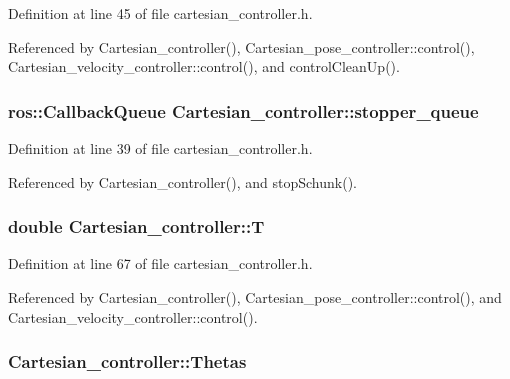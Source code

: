 Definition at line 45 of file cartesian\-\_\-controller.\-h.



Referenced by Cartesian\-\_\-controller(), Cartesian\-\_\-pose\-\_\-controller\-::control(), Cartesian\-\_\-velocity\-\_\-controller\-::control(), and control\-Clean\-Up().

\hypertarget{classCartesian__controller_a52eb090400d8dafaa22aecb037788a66}{
\subsubsection[{stopper\-\_\-queue}]{\setlength{\rightskip}{0pt plus 5cm}ros\-::\-Callback\-Queue Cartesian\-\_\-controller\-::stopper\-\_\-queue\hspace{0.3cm}{\ttfamily [protected]}}}\label{classCartesian__controller_a52eb090400d8dafaa22aecb037788a66}


Definition at line 39 of file cartesian\-\_\-controller.\-h.



Referenced by Cartesian\-\_\-controller(), and stop\-Schunk().

\hypertarget{classCartesian__controller_a35c6ddbb9624878f2807ff644a33e832}{
\subsubsection[{T}]{\setlength{\rightskip}{0pt plus 5cm}double Cartesian\-\_\-controller\-::\-T\hspace{0.3cm}{\ttfamily [protected]}}}\label{classCartesian__controller_a35c6ddbb9624878f2807ff644a33e832}


Definition at line 67 of file cartesian\-\_\-controller.\-h.



Referenced by Cartesian\-\_\-controller(), Cartesian\-\_\-pose\-\_\-controller\-::control(), and Cartesian\-\_\-velocity\-\_\-controller\-::control().

\hypertarget{classCartesian__controller_a0a0f818dad601cd9e3e26cb6959b8eb6}{
\subsubsection[{Thetas}]{ Cartesian\-\_\-controller\-::\-Thetas\hspace{0.3cm}{\ttfamily [protected]}}}\label{classCartesian__controller_a0a0f818dad601cd9e3e26cb6959b8eb6}


